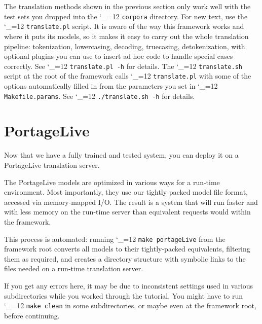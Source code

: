 \documentclass[11pt,letterpaper]{article}
\def\code{\begingroup\catcode`\_=12 \codex}
\newcommand{\codex}[1]{\texttt{#1}\endgroup}
\begin{document}
The translation methods shown in the previous section only work well with the test
sets you dropped into the \code{corpora} directory.
For new text, use the \code{translate.pl} script.
It is aware of the way this framework works and where it puts its
models, so it makes it easy to carry out the whole translation pipeline:
tokenization, lowercasing, decoding, truecasing, detokenization, with optional
plugins you can use to insert ad hoc code to handle special cases correctly.
See \code{translate.pl -h} for details.  The \code{translate.sh} script
at the root of the framework calls \code{translate.pl} with some of the options
automatically filled in from the parameters you set in \code{Makefile.params}.
See \code{./translate.sh -h} for details.

\section{PortageLive} \label{PLive}

Now that we have a fully trained and tested system, you can deploy it
on a PortageLive translation server.

The PortageLive models are optimized in various ways for a run-time
environment.  Most importantly, they use our tightly packed model file format,
accessed via memory-mapped I/O.
The result is a system that will run faster and with less memory on the
run-time server than equivalent requests would within the framework.

This process is automated:
running \code{make portageLive} from the framework
root converts all models to
their tightly-packed equivalents,
filtering them as required, and creates a directory structure with symbolic
links to the files needed on a run-time translation server.

If you get any errors here, it may be due to inconsistent settings used in various subdirectories while you
worked through the tutorial.
You might have to run \code{make clean} in some subdirectories, or maybe even at the framework root,
before continuing.
\end{document}
